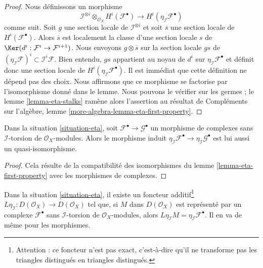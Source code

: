 {\begin{lemma}
\end{lemma}

\begin{proof}

Nous définissons un morphisme
$$
\mathcal{I}^{\otimes i} \otimes_{\mathcal{O}_X} H^i(\mathcal{F}^\bullet)
\longrightarrow
H^i(\eta_\mathcal{I}\mathcal{F}^\bullet)
$$
comme suit. Soit $g$ une section locale de $\mathcal{I}^{\otimes i}$
et soit $\overline{s}$ une section locale de $H^i(\mathcal{F}^\bullet)$. Alors $\overline{s}$ est localement la classe d'une section locale $s$ de
$\Ker(d^i : \mathcal{F}^i \to \mathcal{F}^{i + 1})$. Nous envoyons $g \otimes \overline{s}$ sur la section locale
$gs$ de $(\eta_\mathcal{I}\mathcal{F})^i \subset \mathcal{I}^i\mathcal{F}$. Bien entendu, $gs$ appartient au noyau de $d^i$ sur
$\eta_\mathcal{I}\mathcal{F}^\bullet$ et définit donc une section locale de $H^i(\eta_\mathcal{I}\mathcal{F}^\bullet)$. Il est immédiat que cette définition ne dépend pas des choix. Nous affirmons que ce morphisme se factorise par l'isomorphisme donné dans le lemme. Nous pouvons le vérifier sur les germes ; le lemme \ref{lemma-eta-stalks} ramène alors l'assertion au résultat de Compléments sur l'algèbre, lemme \ref{more-algebra-lemma-eta-first-property}.

\end{proof}

\begin{lemma}

\label{lemma-eta-qis}
Dans la situation \ref{situation-eta}, soit $\mathcal{F}^\bullet \to \mathcal{G}^\bullet$ un morphisme de complexes sans $\mathcal{I}$-torsion de $\mathcal{O}_X$-modules. Alors le morphisme induit $\eta_\mathcal{I}\mathcal{F}^\bullet \to \eta_\mathcal{I}\mathcal{G}^\bullet$ est lui aussi un quasi-isomorphisme.
\end{lemma}

\begin{proof}

Cela résulte de la compatibilité des isomorphismes du lemme \ref{lemma-eta-first-property}
avec les morphismes de complexes.

\end{proof}

\begin{lemma}

\label{lemma-Leta}
Dans la situation \ref{situation-eta}, il existe un foncteur additif\footnote{Attention : ce foncteur n'est pas exact, c'est-à-dire qu'il ne transforme pas les triangles distingués en triangles distingués.} $L\eta_\mathcal{I} : D(\mathcal{O}_X) \to D(\mathcal{O}_X)$ tel que, si $M$ dans $D(\mathcal{O}_X)$ est représenté par un complexe $\mathcal{F}^\bullet$ sans $\mathcal{I}$-torsion de $\mathcal{O}_X$-modules, alors $L\eta_\mathcal{I}M = \eta_\mathcal{I}\mathcal{F}^\bullet$. Il en va de même pour les morphismes.
\end{lemma}

}
